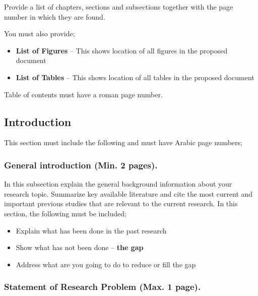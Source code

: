 \documentclass[
  12pt,
  a4paper,
  DIV=11,
  numbers=noendperiod]{scrartcl}
\begin{document}
Provide a list of chapters, sections and subsections together with the
page number in which they are found.

You must also provide;

\begin{itemize}
\item
  \textbf{List of Figures} -- This shows location of all figures in the
  proposed document
\item
  \textbf{List of Tables} -- This shows location of all tables in the
  proposed document
\end{itemize}

Table of contents must have a roman page number.

\hypertarget{introduction}{%
\subsection{Introduction}\label{introduction}}

This section must include the following and must have Arabic page
numbers;

\hypertarget{general-introduction-min.-2-pages.}{%
\subsubsection{General introduction (Min. 2
pages).}\label{general-introduction-min.-2-pages.}}

In this subsection explain the general background information about your
research topic. Summarize key available literature and cite the most
current and important previous studies that are relevant to the current
research. In this section, the following must be included;

\begin{itemize}
\item
  Explain what has been done in the past research
\item
  Show what has not been done -- \textbf{the gap}
\item
  Address what are you going to do to reduce or fill the gap
\end{itemize}

\hypertarget{statement-of-research-problem-max.-1-page.}{%
\subsubsection{Statement of Research Problem (Max. 1
page).}\label{statement-of-research-problem-max.-1-page.}}
\end{document}
